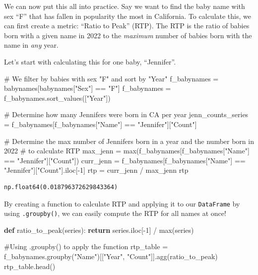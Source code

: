 \documentclass[
  letterpaper,
  DIV=11,
  numbers=noendperiod]{scrreprt}
\newenvironment{Shaded}{\begin{snugshade}}{\end{snugshade}}
\newcommand{\BuiltInTok}[1]{\textcolor[rgb]{0.00,0.23,0.31}{#1}}
\newcommand{\CommentTok}[1]{\textcolor[rgb]{0.37,0.37,0.37}{#1}}
\newcommand{\ControlFlowTok}[1]{\textcolor[rgb]{0.00,0.23,0.31}{\textbf{#1}}}
\newcommand{\DecValTok}[1]{\textcolor[rgb]{0.68,0.00,0.00}{#1}}
\newcommand{\KeywordTok}[1]{\textcolor[rgb]{0.00,0.23,0.31}{\textbf{#1}}}
\newcommand{\NormalTok}[1]{\textcolor[rgb]{0.00,0.23,0.31}{#1}}
\newcommand{\OperatorTok}[1]{\textcolor[rgb]{0.37,0.37,0.37}{#1}}
\newcommand{\StringTok}[1]{\textcolor[rgb]{0.13,0.47,0.30}{#1}}
\begin{document}
We can now put this all into practice. Say we want to find the baby name
with sex ``F'' that has fallen in popularity the most in California. To
calculate this, we can first create a metric: ``Ratio to Peak'' (RTP).
The RTP is the ratio of babies born with a given name in 2022 to the
\emph{maximum} number of babies born with the name in \emph{any} year.

Let's start with calculating this for one baby, ``Jennifer''.

\begin{Shaded}
\begin{Highlighting}[]
\CommentTok{\# We filter by babies with sex "F" and sort by "Year"}
\NormalTok{f\_babynames }\OperatorTok{=}\NormalTok{ babynames[babynames[}\StringTok{"Sex"}\NormalTok{] }\OperatorTok{==} \StringTok{"F"}\NormalTok{]}
\NormalTok{f\_babynames }\OperatorTok{=}\NormalTok{ f\_babynames.sort\_values([}\StringTok{"Year"}\NormalTok{])}

\CommentTok{\# Determine how many Jennifers were born in CA per year}
\NormalTok{jenn\_counts\_series }\OperatorTok{=}\NormalTok{ f\_babynames[f\_babynames[}\StringTok{"Name"}\NormalTok{] }\OperatorTok{==} \StringTok{"Jennifer"}\NormalTok{][}\StringTok{"Count"}\NormalTok{]}

\CommentTok{\# Determine the max number of Jennifers born in a year and the number born in 2022 }
\CommentTok{\# to calculate RTP}
\NormalTok{max\_jenn }\OperatorTok{=} \BuiltInTok{max}\NormalTok{(f\_babynames[f\_babynames[}\StringTok{"Name"}\NormalTok{] }\OperatorTok{==} \StringTok{"Jennifer"}\NormalTok{][}\StringTok{"Count"}\NormalTok{])}
\NormalTok{curr\_jenn }\OperatorTok{=}\NormalTok{ f\_babynames[f\_babynames[}\StringTok{"Name"}\NormalTok{] }\OperatorTok{==} \StringTok{"Jennifer"}\NormalTok{][}\StringTok{"Count"}\NormalTok{].iloc[}\OperatorTok{{-}}\DecValTok{1}\NormalTok{]}
\NormalTok{rtp }\OperatorTok{=}\NormalTok{ curr\_jenn }\OperatorTok{/}\NormalTok{ max\_jenn}
\NormalTok{rtp}
\end{Highlighting}
\end{Shaded}

\begin{verbatim}
np.float64(0.018796372629843364)
\end{verbatim}

By creating a function to calculate RTP and applying it to our
\texttt{DataFrame} by using \texttt{.groupby()}, we can easily compute
the RTP for all names at once!

\begin{Shaded}
\begin{Highlighting}[]
\KeywordTok{def}\NormalTok{ ratio\_to\_peak(series):}
    \ControlFlowTok{return}\NormalTok{ series.iloc[}\OperatorTok{{-}}\DecValTok{1}\NormalTok{] }\OperatorTok{/} \BuiltInTok{max}\NormalTok{(series)}

\CommentTok{\#Using .groupby() to apply the function}
\NormalTok{rtp\_table }\OperatorTok{=}\NormalTok{ f\_babynames.groupby(}\StringTok{"Name"}\NormalTok{)[[}\StringTok{"Year"}\NormalTok{, }\StringTok{"Count"}\NormalTok{]].agg(ratio\_to\_peak)}
\NormalTok{rtp\_table.head()}
\end{Highlighting}
\end{Shaded}
\end{document}
